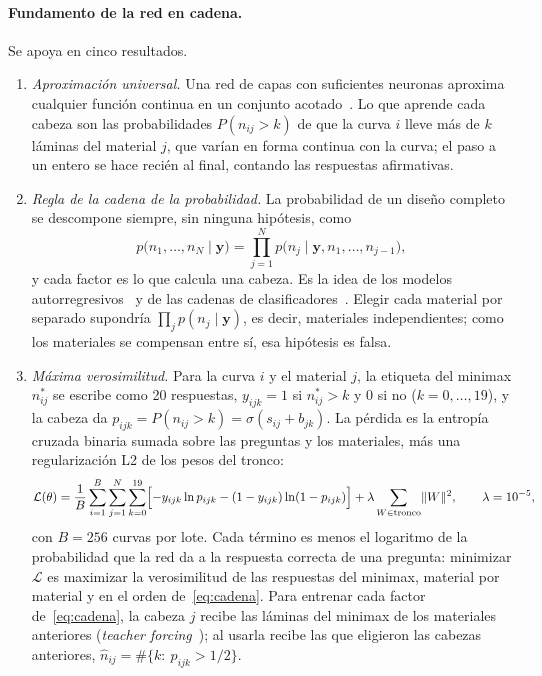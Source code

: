 \paragraph{Fundamento de la red en cadena.} Se apoya en cinco resultados.
\begin{enumerate}[label=(\alph*)]
\item \emph{Aproximación universal.} Una red de capas con suficientes neuronas aproxima cualquier función continua en un conjunto acotado~\cite{cybenko,hornik,leshno}. Lo que aprende cada cabeza son las probabilidades $P(n_{ij}>k)$ de que la curva $i$ lleve más de $k$ láminas del material $j$, que varían en forma continua con la curva; el paso a un entero se hace recién al final, contando las respuestas afirmativas.
\item \emph{Regla de la cadena de la probabilidad.} La probabilidad de un diseño completo se descompone siempre, sin ninguna hipótesis, como
\begin{equation}\label{eq:cadena}
p\bigl(n_{1},\dots,n_{N}\mid\mathbf{y}\bigr)=\prod_{j=1}^{N}p\bigl(n_{j}\mid\mathbf{y},n_{1},\dots,n_{j-1}\bigr),
\end{equation}
y cada factor es lo que calcula una cabeza. Es la idea de los modelos autorregresivos~\cite{larochelle} y de las cadenas de clasificadores~\cite{read11}. Elegir cada material por separado supondría $\prod_j p(n_j\mid\mathbf{y})$, es decir, materiales independientes; como los materiales se compensan entre sí, esa hipótesis es falsa.
\item \emph{Máxima verosimilitud.} Para la curva $i$ y el material $j$, la etiqueta del minimax $n^{*}_{ij}$ se escribe como 20 respuestas, $y_{ijk}=1$ si $n^{*}_{ij}>k$ y 0 si no ($k=0,\ldots,19$), y la cabeza da $p_{ijk}=P(n_{ij}>k)=\sigma(s_{ij}+b_{jk})$. La pérdida es la entropía cruzada binaria sumada sobre las preguntas y los materiales, más una regularización L2 de los pesos del tronco:
\begin{equation}\label{eq:perdida}
\mathcal{L}(\theta)=\frac{1}{B}\sum_{i=1}^{B}\sum_{j=1}^{N}\sum_{k=0}^{19}\Bigl[-y_{ijk}\ln p_{ijk}-(1-y_{ijk})\ln(1-p_{ijk})\Bigr]+\lambda\sum_{W\in\text{tronco}}\lVert W\rVert^{2},\qquad \lambda=10^{-5},
\end{equation}
con $B=256$ curvas por lote. Cada término es menos el logaritmo de la probabilidad que la red da a la respuesta correcta de una pregunta: minimizar $\mathcal{L}$ es maximizar la verosimilitud de las respuestas del minimax, material por material y en el orden de~\eqref{eq:cadena}. Para entrenar cada factor de~\eqref{eq:cadena}, la cabeza $j$ recibe las láminas del minimax de los materiales anteriores (\emph{teacher forcing}~\cite{williams}); al usarla recibe las que eligieron las cabezas anteriores, $\hat n_{ij}=\#\{k:\ p_{ijk}>1/2\}$.

\end{enumerate}
